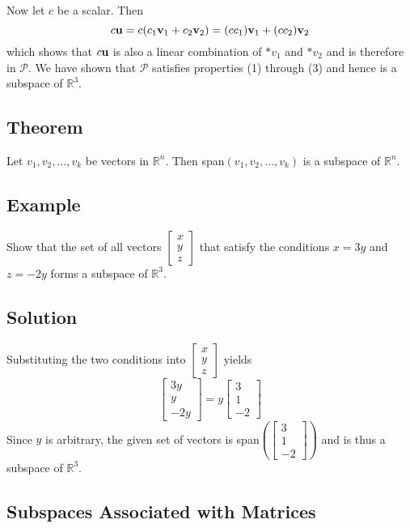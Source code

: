 Now let $c$ be a scalar. Then
\[c\mathbf{u}=c(c_1\mathbf{v}_1+c_2\mathbf{v}_2)=(cc_1)\mathbf{v}_1+(cc_2)\mathbf{v}_2\]
which shows that $c\mathbf{u}$ is also a linear combination of $*v_1$ and $*v_2$ and is
therefore in $\mathscr{P}$. We have shown that $\mathscr{P}$ satisfies properties
(1) through (3) and hence is a subspace of $\mathbb{R}^3$.

\subsection*{Theorem}
Let $v_1, v_2, \dots, v_k$ be vectors in $\mathbb{R}^n$. Then span$(v_1, v_2, \dots, v_k)$
is a subspace of $\mathbb{R}^n$.

\subsection*{Example}
Show that the set of all vectors $\begin{bmatrix}
        x \\y\\z
    \end{bmatrix}$ that satisfy the conditions $x=3y$ and $z=-2y$ forms a subspace of $\mathbb{R}^3$.

\subsection*{Solution}
Substituting the two conditions into $\begin{bmatrix}
        x \\y\\z
    \end{bmatrix}$ yields
\[
    \begin{bmatrix}
        3y \\y\\-2y
    \end{bmatrix}=y\begin{bmatrix}
        3 \\1\\-2
    \end{bmatrix}
\]
Since $y$ is arbitrary, the given set of vectors is span$\left(\begin{bmatrix}
            3 \\1\\-2
        \end{bmatrix}\right)$ and is thus a subspace of $\mathbb{R}^3$.

\subsection*{Subspaces Associated with Matrices}

